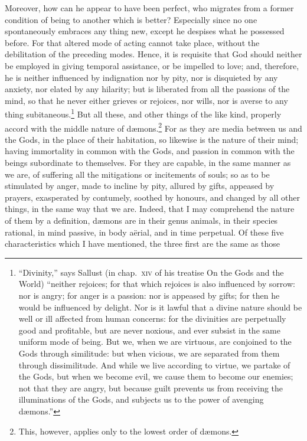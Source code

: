 \documentclass[12pt]{article}
\begin{document}
Moreover, how can he appear to have been perfect, who migrates from a former
condition of being to another which is better? Especially since no one
spontaneously embraces any thing new, except he despises what he possessed
before. For that altered mode of acting cannot take place, without the
debilitation of the preceding modes. Hence, it is requisite that God should
neither be employed in giving temporal assistance, or be impelled to love; and,
therefore, he is neither influenced by indignation nor by pity, nor is
disquieted by any anxiety, nor elated by any hilarity; but is liberated from
all the passions of the mind, so that he never either grieves or rejoices, nor
wills, nor is averse to any thing subitaneous.\footnote{\-``Divinity,'' says
Sallust (in chap.~\textsc{xiv} of his treatise On the Gods and the World)
``neither rejoices; for that which rejoices is also influenced by sorrow: nor
is angry; for anger is a passion: nor is appeased by gifts; for then he would
be influenced by delight. Nor is it lawful that a divine nature should be well
or ill affected from human concerns: for the divinities are perpetually good
and profitable, but are never noxious, and ever subsist in the same uniform
mode of being. But we, when we are virtuous, are conjoined to the Gods through
similitude: but when vicious, we are separated from them through dissimilitude.
And while we live according to virtue, we partake of the Gods, but when we
become evil, we cause them to become our enemies; not that they are angry, but
because guilt prevents us from receiving the illuminations of the Gods, and
subjects us to the power of avenging d{\ae}mons.''} But all these, and other
things of the like kind, properly accord with the middle nature of
d{\ae}mons.\footnote{This, however, applies only to the lowest order of
d{\ae}mons.} For as they are media between us and the Gods, in the place of
their habitation, so likewise is the nature of their mind; having immortality
in common with the Gods, and passion in common with the beings subordinate to
themselves.  For they are capable, in the same manner as we are, of suffering
all the mitigations or incitements of souls; so as to be stimulated by anger,
made to incline by pity, allured by gifts, appeased by prayers, exasperated by
contumely, soothed by honours, and changed by all other things, in the same way
that we are. Indeed, that I may comprehend the nature of them by a definition,
d{\ae}mons are in their genus animals, in their species rational, in mind
passive, in body a\"{e}rial, and in time perpetual. Of these five
characteristics which I have mentioned, the three first are the same as those
\end{document}
